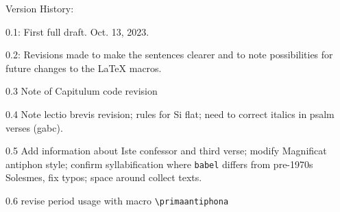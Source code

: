 \documentclass[11pt]{article}
\begin{document}
Version History:

0.1: First full draft. Oct. 13, 2023.

0.2: Revisions made to make the sentences clearer and to note possibilities for future changes to the LaTeX macros.

0.3 Note of Capitulum code revision

0.4 Note lectio brevis revision; rules for Si flat; need to correct italics in psalm verses (gabc).

0.5 Add information about Iste confessor and third verse; modify Magnificat antiphon style; confirm syllabification where \verb|babel| differs from pre-1970s Solesmes, fix typos; space around collect texts.

0.6 revise period usage with macro \verb|\primaantiphona|
\end{document}
